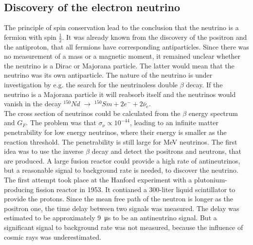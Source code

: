 \subsection{Discovery of the electron neutrino}
The principle of spin conservation lead to the conclusion that the neutrino is a fermion with spin $\frac{1}{2}$. It was already known from the discovery of the positron and the antiproton, that all fermions have corresponding antiparticles. Since there was no measurement of a mass or a magnetic moment, it remained unclear whether the neutrino is a Dirac or Majorana particle. The latter would mean that the neutrino was its own antiparticle. The nature of the neutrino is under investigation by e.g. the search for the neutrinoless double $\beta$ decay. If the neutrino is a Majorana particle it will reabsorb itself and the neutrinos would vanish in the decay $^{150}Nd \; \rightarrow \; ^{150}Sm + 2 e^{-} + 2 \bar{\nu}_e$.\\
The cross section of neutrinos could be calculated from the $\beta$ energy spectrum and $G_F$. The problem was that $\sigma_{\nu} \propto 10^{-44}$, leading to an infinite matter penetrability for low energy neutrinos, where their energy is smaller as the reaction threshold. The penetrability is still large for \si{\mega\electronvolt} neutrinos. The first idea was to use the inverse $\beta$ decay and detect the positrons and neutrons, that are produced. A large fusion reactor could provide a high rate of antineutrinos, but a reasonable signal to background rate is needed, to discover the neutrino.\\
The first attempt took place at the Hanford experiment with a plutonium-producing fission reactor in 1953. It contianed a 300-liter liquid scintillator to provide the protons. Since the mean free path of the neutron is longer as the positron one, the time delay between two signals was measured. The delay was estimated to be approximately \SI{9}{\micro\second} to be an antineutrino signal. But a significant signal to background rate was not measured, because the influence of cosmic rays was underestimated.\\
